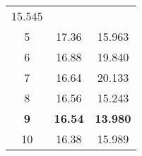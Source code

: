 \documentclass[11pt]{article}
\begin{document}
\begin{longtable}[]{@{}ccc@{}}
\begin{minipage}[t]{0.49\columnwidth}
15.545\strut
\end{minipage}\tabularnewline
\begin{minipage}[t]{0.19\columnwidth}\centering\strut
5\strut
\end{minipage} & \begin{minipage}[t]{0.22\columnwidth}\centering\strut
17.36\strut
\end{minipage} & \begin{minipage}[t]{0.49\columnwidth}\centering\strut
15.963\strut
\end{minipage}\tabularnewline
\begin{minipage}[t]{0.19\columnwidth}\centering\strut
6\strut
\end{minipage} & \begin{minipage}[t]{0.22\columnwidth}\centering\strut
16.88\strut
\end{minipage} & \begin{minipage}[t]{0.49\columnwidth}\centering\strut
19.840\strut
\end{minipage}\tabularnewline
\begin{minipage}[t]{0.19\columnwidth}\centering\strut
7\strut
\end{minipage} & \begin{minipage}[t]{0.22\columnwidth}\centering\strut
16.64\strut
\end{minipage} & \begin{minipage}[t]{0.49\columnwidth}\centering\strut
20.133\strut
\end{minipage}\tabularnewline
\begin{minipage}[t]{0.19\columnwidth}\centering\strut
8\strut
\end{minipage} & \begin{minipage}[t]{0.22\columnwidth}\centering\strut
16.56\strut
\end{minipage} & \begin{minipage}[t]{0.49\columnwidth}\centering\strut
15.243\strut
\end{minipage}\tabularnewline
\begin{minipage}[t]{0.19\columnwidth}\centering\strut
\textbf{9}\strut
\end{minipage} & \begin{minipage}[t]{0.22\columnwidth}\centering\strut
\textbf{16.54}\strut
\end{minipage} & \begin{minipage}[t]{0.49\columnwidth}\centering\strut
\textbf{13.980}\strut
\end{minipage}\tabularnewline
\begin{minipage}[t]{0.19\columnwidth}\centering\strut
10\strut
\end{minipage} & \begin{minipage}[t]{0.22\columnwidth}\centering\strut
16.38\strut
\end{minipage} & \begin{minipage}[t]{0.49\columnwidth}\centering\strut
15.989\strut
\end{minipage}\tabularnewline
\bottomrule
\end{longtable}
\end{document}
